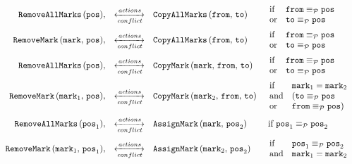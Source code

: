\documentclass{article}
\newcommand{\cActions}{\xleftrightarrow[conflict]{actions}}
\newcommand{\pEquiv}{\equiv_\mathcal{P}}
\begin{document}
{\[\begin{array}{rcll}
\texttt{RemoveAllMarks}\,(\texttt{pos}), &
\cActions &
\texttt{CopyAllMarks}\,(\texttt{from},\,\texttt{to}) &
\begin{array}{ll}
\mbox{if} & \texttt{from} \pEquiv \texttt{pos} \\
\mbox{or} & \texttt{to} \pEquiv \texttt{pos}
\end{array}
\vspace{2mm} \\

\texttt{RemoveMark}\,(\texttt{mark},\,\texttt{pos}), &
\cActions &
\texttt{CopyAllMarks}\,(\texttt{from},\,\texttt{to}) &
\begin{array}{ll}
\mbox{if} & \texttt{from} \pEquiv \texttt{pos} \\
\mbox{or} & \texttt{to} \pEquiv \texttt{pos}
\end{array}
\vspace{2mm}\\

\texttt{RemoveAllMarks}\,(\texttt{pos}), &
\cActions &
\texttt{CopyMark}\,(\texttt{mark},\,\texttt{from},\,\texttt{to}) &
\begin{array}{ll}
\mbox{if} & \texttt{from} \pEquiv \texttt{pos} \\
\mbox{or} & \texttt{to} \pEquiv \texttt{pos}
\end{array}
\vspace{2mm} \\

\texttt{RemoveMark}\,(\texttt{mark}_1,\,\texttt{pos}), &
\cActions &
\texttt{CopyMark}\,(\texttt{mark}_2,\,\texttt{from},\,\texttt{to}) &
\begin{array}{ll}
\mbox{if} & \texttt{mark}_1 = \texttt{mark}_2 \\
\mbox{and} & (\texttt{to} \pEquiv \texttt{pos} \\
\mbox{or} & \texttt{from} \pEquiv \texttt{pos})
\end{array}
\vspace{2mm} \\

\texttt{RemoveAllMarks}\,(\texttt{pos}_1), &
\cActions &
\texttt{AssignMark}\,(\texttt{mark},\,\texttt{pos}_2) &
\mbox{ if } \texttt{pos}_1 \pEquiv \texttt{pos}_2
\vspace{2mm} \\

\texttt{RemoveMark}\,(\texttt{mark}_1,\,\texttt{pos}_1), &
\cActions &
\texttt{AssignMark}\,(\texttt{mark}_2,\,\texttt{pos}_2) &
\begin{array}{ll}
\mbox{if} & \texttt{pos}_1 \pEquiv \texttt{pos}_2 \\
\mbox{and} & \texttt{mark}_1 = \texttt{mark}_2
\end{array}
\vspace{2mm} \\


\end{array}\]}
\end{document}
